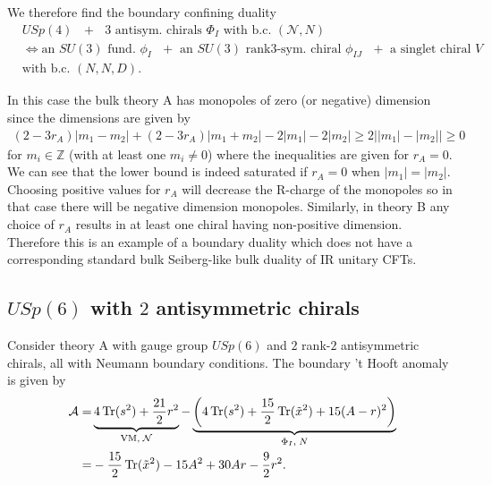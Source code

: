 \documentclass[12pt]{article}
\newcommand{\Zb}{\mathbb{Z}}
\newcommand{\Acal}{\mathcal{A}}
\newcommand{\Ncal}{\mathcal{N}}
\DeclareMathOperator*{\Tr}{{\rm Tr}}
\numberwithin{equation}{section}
\begin{document}
We therefore find the boundary confining duality 
\begin{align}
\label{bcdual_USp4_3AS_dual}
&\textrm{$USp(4)$ $+$ $3$ antisym. chirals $\Phi_{I}$ with b.c. $(\mathcal{N},N)$}
\nonumber\\
&\Leftrightarrow 
\textrm{
an $SU(3)$ fund. $\phi_I$ $+$ 
an $SU(3)$ rank3-sym. chiral $\phi_{IJ}$ $+$ 
a singlet chiral $V$
}
\nonumber\\
&\textrm{with b.c. $(N,N,D)$}. 
\end{align}

In this case the bulk theory A has monopoles of zero (or negative) dimension since the dimensions are given by
\begin{align}
\label{Mono_Ch_usp4_0_3}
    (2 - 3r_A)|m_1 - m_2| + (2 - 3r_A)|m_1 + m_2| - 2|m_1| - 2|m_2| \ge 2\big| |m_1| - |m_2| \big| \ge 0
\end{align}
for $m_i \in \Zb$ (with at least one $m_i \ne 0$) where the inequalities are given for $r_A = 0$.
We can see that the lower bound is indeed saturated if $r_A = 0$ when $|m_1| = |m_2|$. Choosing positive values for $r_A$ will decrease the R-charge of the monopoles so in that case there will be negative dimension monopoles. Similarly, in theory B any choice of $r_A$ results in at least one chiral having non-positive dimension.
Therefore this is an example of a boundary duality which does not have a corresponding standard bulk Seiberg-like bulk duality of IR unitary CFTs.

\subsection{$USp(6)$ with $2$ antisymmetric chirals}
\label{sec_GNR_USp6_2AS_integral}
Consider theory A with gauge group $USp(6)$ and $2$ rank-$2$ antisymmetric chirals, all with Neumann boundary conditions. 
The boundary 't Hooft anomaly is given by
\begin{align}
\label{bdy_USp6_2AS_anomA}
\Acal = & \underbrace{4\Tr(s^2) + \frac{21}{2}r^2}_{\textrm{VM}, \; \Ncal}
 - \underbrace{\left( 4\Tr(s^2) + \frac{15}{2}\Tr(\tilde{x}^2) + 15(A-r)^2 \right)}_{\Phi_I, \; N}
  \nonumber \\
  = & - \frac{15}{2}\Tr(\tilde{x}^2) - 15A^2 + 30Ar - \frac{9}{2}r^2. 
\end{align}
\end{document}
